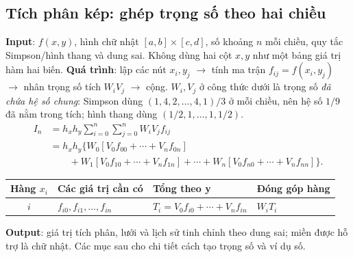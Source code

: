 \subsection{Tích phân kép: ghép trọng số theo hai chiều}
\textbf{Input}: $f(x,y)$, hình chữ nhật $[a,b]\times[c,d]$, số khoảng $n$ mỗi chiều, quy tắc Simpson/hình thang và dung sai. Không dùng hai cột $x,y$ như một bảng giá trị hàm hai biến.
\textbf{Quá trình}: lập các nút $x_i,y_j$ $\to$ tính ma trận $f_{ij}=f(x_i,y_j)$ $\to$ nhân trọng số tích $W_iV_j$ $\to$ cộng. $W_i,V_j$ ở công thức dưới là trọng số \emph{đã chứa hệ số chung}: Simpson dùng $(1,4,2,\ldots,4,1)/3$ ở mỗi chiều, nên hệ số $1/9$ đã nằm trong tích; hình thang dùng $(1/2,1,\ldots,1,1/2)$.
\begin{align*}
I_n&=h_xh_y\sum_{i=0}^n\sum_{j=0}^nW_iV_jf_{ij}\\
 &=h_xh_y\{W_0[V_0f_{00}+\cdots+V_nf_{0n}]\\
 &\qquad+W_1[V_0f_{10}+\cdots+V_nf_{1n}]+\cdots+W_n[V_0f_{n0}+\cdots+V_nf_{nn}]\}.
\end{align*}
\begin{center}\small\begin{tabular}{clll}\toprule
Hàng $x_i$&Các giá trị cần có&Tổng theo y&Đóng góp hàng\\\midrule
$i$&$f_{i0},f_{i1},\ldots,f_{in}$&$T_i=V_0f_{i0}+\cdots+V_nf_{in}$&$W_iT_i$\\\bottomrule
\end{tabular}\end{center}
\textbf{Output}: giá trị tích phân, lưới và lịch sử tinh chỉnh theo dung sai; miền được hỗ trợ là chữ nhật. Các mục sau cho chi tiết cách tạo trọng số và ví dụ số.
